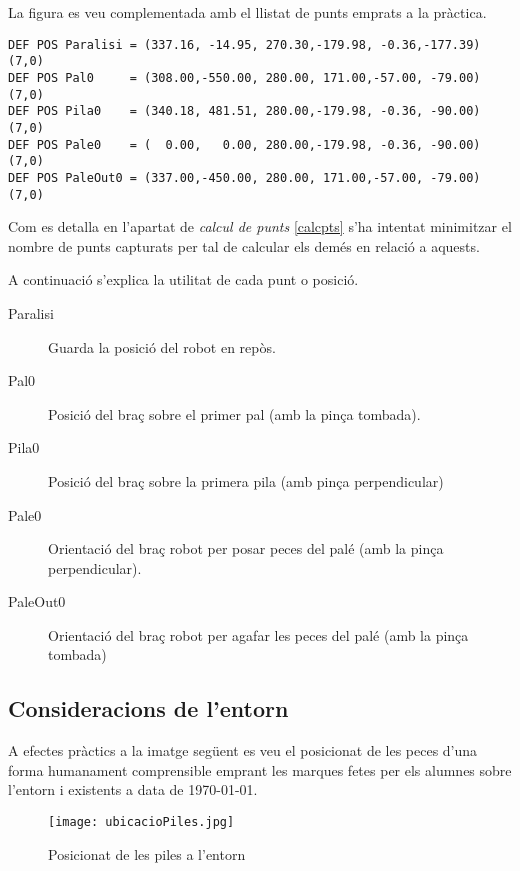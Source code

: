 La figura es veu complementada amb el llistat de punts emprats a la pràctica.

\begin{verbatim}
DEF POS Paralisi = (337.16, -14.95, 270.30,-179.98, -0.36,-177.39)(7,0)
DEF POS Pal0     = (308.00,-550.00, 280.00, 171.00,-57.00, -79.00)(7,0)
DEF POS Pila0    = (340.18, 481.51, 280.00,-179.98, -0.36, -90.00)(7,0)
DEF POS Pale0    = (  0.00,   0.00, 280.00,-179.98, -0.36, -90.00)(7,0)
DEF POS PaleOut0 = (337.00,-450.00, 280.00, 171.00,-57.00, -79.00)(7,0)
\end{verbatim}

Com es detalla en l'apartat de \emph{calcul de punts} \ref{calcpts}
s'ha intentat minimitzar el nombre de punts capturats per tal
de calcular els demés en relació a aquests.

A continuació s'explica la utilitat de cada punt o posició.

\begin{description}
 \item [Paralisi] Guarda la posició del robot en repòs.
 \item [Pal0] Posició del braç sobre el primer pal (amb la pinça tombada).
 \item [Pila0] Posició del braç sobre la primera pila (amb pinça perpendicular)
 \item [Pale0] Orientació del braç robot per posar peces del palé (amb la pinça
perpendicular).
 \item [PaleOut0] Orientació del braç robot per agafar les peces del palé
(amb la pinça tombada) 
\end{description}

\subsection{Consideracions de l'entorn}

A efectes pràctics a la imatge següent es veu el posicionat de les peces d'una forma
humanament comprensible emprant les marques fetes per els alumnes sobre l'entorn i existents
a data de \today. 

\begin{figure}[H]
\begin{center}\label{fig:palmog}
 \texttt{[image: ubicacioPiles.jpg]}
\end{center}
  \caption{Posicionat de les piles a l'entorn}
\end{figure}

